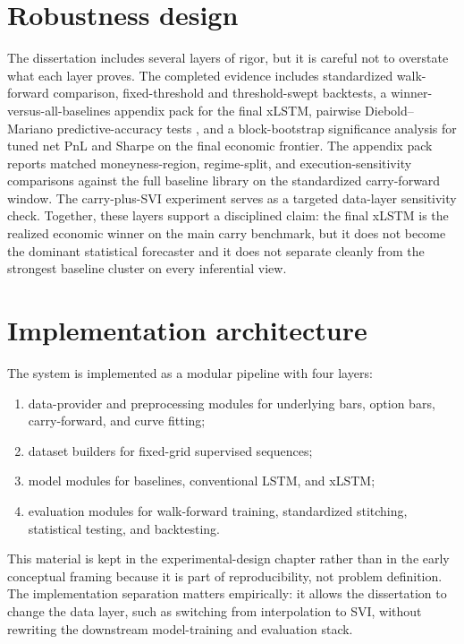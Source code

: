 \documentclass[12pt]{report}
\begin{document}
\section{Robustness design}
The dissertation includes several layers of rigor, but it is careful not to overstate what each layer proves. The completed evidence includes standardized walk-forward comparison, fixed-threshold and threshold-swept backtests, a winner-versus-all-baselines appendix pack for the final xLSTM, pairwise Diebold--Mariano predictive-accuracy tests \citep{diebold1995}, and a block-bootstrap significance analysis for tuned net PnL and Sharpe on the final economic frontier. The appendix pack reports matched moneyness-region, regime-split, and execution-sensitivity comparisons against the full baseline library on the standardized carry-forward window. The carry-plus-SVI experiment serves as a targeted data-layer sensitivity check. Together, these layers support a disciplined claim: the final xLSTM is the realized economic winner on the main carry benchmark, but it does not become the dominant statistical forecaster and it does not separate cleanly from the strongest baseline cluster on every inferential view.

\section{Implementation architecture}
The system is implemented as a modular pipeline with four layers:
\begin{enumerate}[leftmargin=1.2cm]
    \item data-provider and preprocessing modules for underlying bars, option bars, carry-forward, and curve fitting;
    \item dataset builders for fixed-grid supervised sequences;
    \item model modules for baselines, conventional LSTM, and xLSTM;
    \item evaluation modules for walk-forward training, standardized stitching, statistical testing, and backtesting.
\end{enumerate}

This material is kept in the experimental-design chapter rather than in the early conceptual framing because it is part of reproducibility, not problem definition. The implementation separation matters empirically: it allows the dissertation to change the data layer, such as switching from interpolation to SVI, without rewriting the downstream model-training and evaluation stack.
\end{document}
